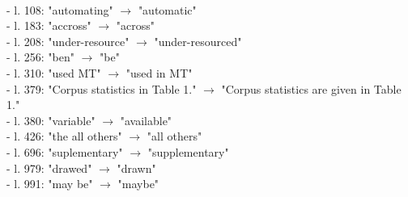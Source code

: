 \documentclass[12pt,times,a4paper,twoside]{article}
\theoremstyle{definition}
\begin{document}
\\
- l. 108: "automating" $\rightarrow$ "automatic"
\\
- l. 183: "accross" $\rightarrow$ "across"
\\
- l. 208: "under-resource" $\rightarrow$ "under-resourced"
\\
- l. 256: "ben" $\rightarrow$ "be"
\\
- l. 310: "used MT" $\rightarrow$ "used in MT"
\\
- l. 379: "Corpus statistics in Table 1." $\rightarrow$ "Corpus statistics are given in
Table 1."
\\
- l. 380: "variable" $\rightarrow$ "available"
\\
- l. 426: "the all others" $\rightarrow$ "all others"
\\
- l. 696: "suplementary" $\rightarrow$ "supplementary"
\\
- l. 979: "drawed" $\rightarrow$ "drawn"
\\
- l. 991: "may be" $\rightarrow$ "maybe"



\end{document}
